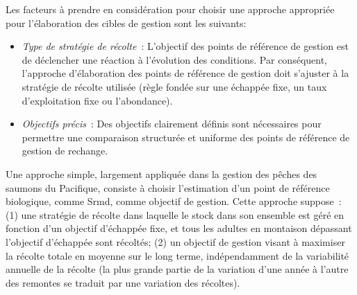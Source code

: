 \documentclass[french,11pt]{book}
\begin{document}
Les facteurs à prendre en considération pour choisir une approche appropriée pour l'élaboration des cibles de gestion sont les suivants:
\begin{itemize}

\item
  \emph{Type de stratégie de récolte}~: L'objectif des points de référence de gestion est de déclencher une réaction à l'évolution des conditions. Par conséquent, l'approche d'élaboration des points de référence de gestion doit s'ajuster à la stratégie de récolte utilisée (règle fondée sur une échappée fixe, un taux d'exploitation fixe ou l'abondance).
\item
  \emph{Objectifs précis}~: Des objectifs clairement définis sont nécessaires pour permettre une comparaison structurée et uniforme des points de référence de gestion de rechange.
\end{itemize}
Une approche simple, largement appliquée dans la gestion des pêches des saumons du Pacifique, consiste à choisir l'estimation d'un point de référence biologique, comme Srmd, comme objectif de gestion. Cette approche suppose~: (1) une stratégie de récolte dans laquelle le stock dans son ensemble est géré en fonction d'un objectif d'échappée fixe, et tous les adultes en montaison dépassant l'objectif d'échappée sont récoltés; (2) un objectif de gestion visant à maximiser la récolte totale en moyenne sur le long terme, indépendamment de la variabilité annuelle de la récolte (la plus grande partie de la variation d'une année à l'autre des remontes se traduit par une variation des récoltes).
\end{document}
